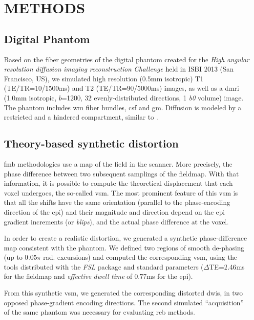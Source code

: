 \section{METHODS}

\subsection{Digital Phantom}
Based on the fiber geometries of the digital phantom 
created for the \emph{High angular resolution diffusion imaging 
reconstruction Challenge} held in ISBI 2013 
(San Francisco, US), we simulated high resolution 
(0.5mm isotropic) T1 (TE/TR=10/1500ms) and T2 
(TE/TR=90/5000ms) images, as well as a \gls*{dmri}
(1.0mm isotropic, $b$=1200, 32 evenly-distributed 
directions, 1 \textit{b0} volume) image.
The phantom includes \gls*{wm} fiber bundles, 
\gls*{csf} and \gls*{gm}. Diffusion is modeled by a 
restricted and a hindered compartment, similar to
\cite{assaf_composite_2005}.

\subsection{Theory-based synthetic distortion}
\label{sec:distortion}
\Gls*{fmb} methodologies use a map
of the field in the scanner. More precisely, the
phase difference between two subsequent samplings
of the fieldmap. With that information, it is possible
to compute the theoretical displacement that each
voxel undergoes, the so-called \gls*{vsm}. The
most prominent feature of this \gls*{vsm} is that all
the shifts have the same orientation (parallel to the
phase-encoding direction of the \gls*{epi}) and their
magnitude and direction depend on the \gls*{epi} 
gradient increments (or \emph{blips}), and the actual
phase difference at the voxel.

In order to create a realistic distortion, we
generated a synthetic phase-difference map 
consistent with the phantom.  We defined two regions 
of smooth de-phasing (up to $0.05\pi$ rad. excursions) 
and computed the corresponding \gls*{vsm}, using the 
tools distributed with the \emph{FSL} package 
\cite{jenkinson_fsl_2012}  and
standard parameters ($\Delta$TE=2.46ms for the
fieldmap and \emph{effective dwell time} of 
0.77ms for the \gls*{epi}).

From this synthetic \gls*{vsm},
we generated
the corresponding distorted \glspl*{dwi}, in two opposed
phase-gradient encoding directions. The second simulated
``acquisition'' of the same phantom was necessary 
for evaluating \gls*{reb} methods.

